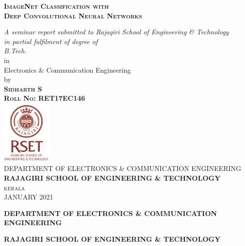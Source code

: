 \documentclass[11pt]{report}
\begin{document}
\begin{titlepage}
\author{Sidharth S}
\newcommand{\HRule}{\rule{\linewidth}{0.5mm}}

\center %
 
\textsc{\LARGE \textbf{ImageNet Classification with\\[0.25cm] Deep Convolutional Neural Networks\\[0.99cm]}} %

{ \it A seminar report submitted to Rajagiri School of Engineering \& Technology\\ in partial fulfilment of degree of \\[0.75cm]B.Tech.\\[0.5cm]}{in\\[0.5cm] Electronics \& Communication Engineering\\[0.75cm]by}\\[0.5cm]\textsc{\textbf{Sidharth S \\[0.35cm]Roll No: RET17EC146}}\\[1cm] %


\includegraphics[width=2.5cm]{Rset Vertical.jpg}\\[1cm]
 
\textsc{DEPARTMENT OF ELECTRONICS \& COMMUNICATION ENGINEERING\\[0.15cm]\textsc{\textbf{RAJAGIRI SCHOOL OF ENGINEERING \& TECHNOLOGY}}\\[0.15cm]kerala\\[0.15cm]}{JANUARY 2021}
\thispagestyle{empty}
\end{titlepage}

\vfill %
\thispagestyle{empty}

\vspace*{-0.3cm}
\begin{center}
{\large \bf  DEPARTMENT OF ELECTRONICS \& COMMUNICATION ENGINEERING}\vspace{0.1cm}
\end{center}

\begin{center} 
{\Large \bf RAJAGIRI SCHOOL OF ENGINEERING \& TECHNOLOGY}\vspace{0.1cm}
\end{center}
\end{document}
